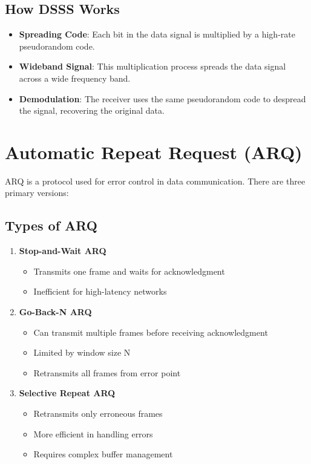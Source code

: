 \documentclass[12pt,a4paper]{article}
\begin{document}
\subsection{How DSSS Works}
\begin{itemize}
    \item \textbf{Spreading Code}: Each bit in the data signal is multiplied by a high-rate pseudorandom code.
    \item \textbf{Wideband Signal}: This multiplication process spreads the data signal across a wide frequency band.
    \item \textbf{Demodulation}: The receiver uses the same pseudorandom code to despread the signal, recovering the original data.
\end{itemize}

\section{Automatic Repeat Request (ARQ)}
ARQ is a protocol used for error control in data communication. There are three primary versions:

\subsection{Types of ARQ}
\begin{enumerate}
    \item \textbf{Stop-and-Wait ARQ}
    \begin{itemize}
        \item Transmits one frame and waits for acknowledgment
        \item Inefficient for high-latency networks
    \end{itemize}
    
    \item \textbf{Go-Back-N ARQ}
    \begin{itemize}
        \item Can transmit multiple frames before receiving acknowledgment
        \item Limited by window size N
        \item Retransmits all frames from error point
    \end{itemize}
    
    \item \textbf{Selective Repeat ARQ}
    \begin{itemize}
        \item Retransmits only erroneous frames
        \item More efficient in handling errors
        \item Requires complex buffer management
    \end{itemize}
\end{enumerate}
\end{document}
